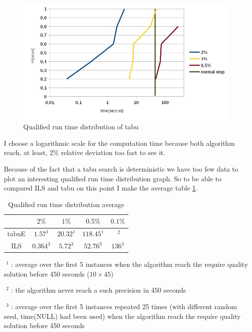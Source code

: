 \documentclass[12pt,a4paper]{article}
\begin{document}
\begin{figure}[!h]
\centering
\includegraphics[scale=0.35]{Qualified_run_time_distribution2.jpg}
\caption{Qualified run time distribution of tabu}
\label{Qualified run time distribution of tabu}
\end{figure}
I choose a logarithmic scale for the computation time because both algorithm reach, at least, $2\%$ relative deviation too fast to see it.

Because of the fact that a tabu search is deterministic we have too few data to plot an interesting qualified run time distribution graph. So to be able to compared ILS and tabu on this point I make the average table \ref{Qualified run time distribution average}.

\begin{table}[!h]
\centering
\begin{tabular}{|*{5}{c|}}
  \hline
  ~ & $2\%$ & $1\%$ & $0.5\%$ & $0.1\%$ \\
  \hline
   tabuE & $1.57^1$ & $20.32^1$ & $118.45^1$ & $\text{~}^2$ \\ 
   ILS & $0.364^3$ & $5.72^3$ & $52.76^3$ & $136^3$ \\
  \hline
\end{tabular}
\caption{Qualified run time distribution average}
\label{Qualified run time distribution average}
\end{table}

$\text{~}^1$ : average over the first 5 instances when the algorithm reach the require quality solution before 450 seconds ($10 \times 45$)

$\text{~}^2$ : the algorithm never reach a such precision in 450 seconds

$\text{~}^3$ : average over the first 5 instances repeated 25 times (with different random seed, time(NULL) had been used) when the algorithm reach the require quality solution before 450 seconds\\
\end{document}
